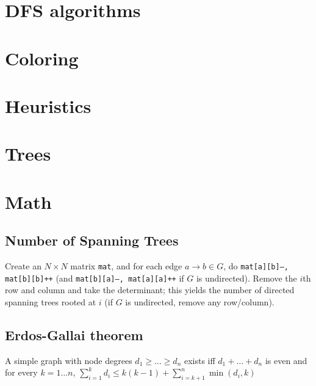 \section{DFS algorithms}

\section{Coloring}

\section{Heuristics}

\section{Trees}


\section{Math}
	\subsection{Number of Spanning Trees}
		Create an $N\times N$ matrix \texttt{mat}, and for each edge $a \rightarrow b \in G$, do
		\texttt{mat[a][b]--, mat[b][b]++} (and \texttt{mat[b][a]--, mat[a][a]++} if $G$ is undirected).
		Remove the $i$th row and column and take the determinant; this yields the number of directed spanning trees rooted at $i$
		(if $G$ is undirected, remove any row/column).

	\subsection{Erdos-Gallai theorem}
		A simple graph with node degrees $d_1 \ge \dots \ge d_n$ exists iff $d_1 + \dots + d_n$ is even and for every $k = 1\dots n$, $\sum _{i=1}^{k}d_{i}\leq k(k-1)+\sum _{i=k+1}^{n}\min(d_{i},k)$
